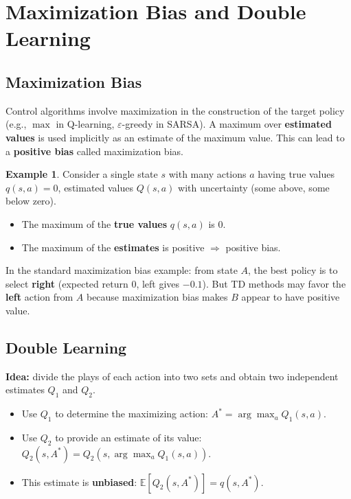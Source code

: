 \documentclass[11pt,a4paper]{article}
\theoremstyle{definition}
\newtheorem{example}{Example}[section]
\theoremstyle{plain}
\theoremstyle{remark}
\begin{document}
\section{Maximization Bias and Double Learning}

\subsection{Maximization Bias}

Control algorithms involve maximization in the construction of the target policy (e.g., $\max$ in Q-learning, $\varepsilon$-greedy in SARSA). A maximum over \textbf{estimated values} is used implicitly as an estimate of the maximum value. This can lead to a \textbf{positive bias} called maximization bias.

\begin{example}
Consider a single state $s$ with many actions $a$ having true values $q(s, a) = 0$, estimated values $Q(s, a)$ with uncertainty (some above, some below zero).
\begin{itemize}
    \item The maximum of the \textbf{true values} $q(s, a)$ is $0$.
    \item The maximum of the \textbf{estimates} is positive $\Rightarrow$ positive bias.
\end{itemize}
In the standard maximization bias example: from state $A$, the best policy is to select \textbf{right} (expected return $0$, left gives $-0.1$). But TD methods may favor the \textbf{left} action from $A$ because maximization bias makes $B$ appear to have positive value.
\end{example}

\subsection{Double Learning}

\textbf{Idea:} divide the plays of each action into two sets and obtain two independent estimates $Q_1$ and $Q_2$.
\begin{itemize}
    \item Use $Q_1$ to determine the maximizing action: $A^* = \arg\max_a Q_1(s, a)$.
    \item Use $Q_2$ to provide an estimate of its value: $Q_2(s, A^*) = Q_2(s, \arg\max_a Q_1(s, a))$.
    \item This estimate is \textbf{unbiased}: $\mathbb{E}[Q_2(s, A^*)] = q(s, A^*)$.
\end{itemize}
\end{document}
